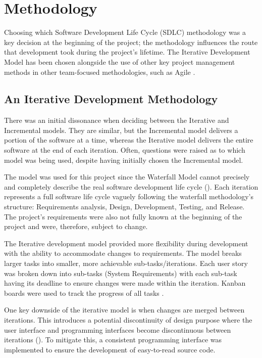 \chapter{Methodology}
\label{chap:methodology}

Choosing which Software Development Life Cycle (SDLC) methodology was a key decision at the beginning of the project; the methodology influences the route that development took during the project's lifetime. The Iterative Development Model has been chosen alongside the use of other key project management methods in other team-focused methodologies, such as Agile .

\section{An Iterative Development Methodology}
\label{methodology:chosen}

There was an initial dissonance when deciding between the Iterative and Incremental models. They are similar, but the Incremental model delivers a portion of the software at a time, whereas the Iterative model delivers the entire software at the end of each iteration. Often, questions were raised as to which model was being used, despite having initially chosen the Incremental model. 

The model was used for this project since the Waterfall Model cannot precisely and completely describe the real software development life cycle (\cite{dapeng_liu_case_2011}). Each iteration represents a full software life cycle vaguely following the waterfall methodology's structure: Requirements analysis, Design, Development, Testing, and Release. The project's requirements were also not fully known at the beginning of the project and were, therefore, subject to change. 

The Iterative development model provided more flexibility during development with the ability to accommodate changes to requirements. The model breaks larger tasks into smaller, more achievable sub-tasks/iterations. Each user story was broken down into sub-tasks (System Requirements)  with each sub-task having its deadline to ensure changes were made within the iteration. Kanban boards were used to track the progress of all tasks .

One key downside of the iterative model is when changes are merged between iterations. This introduces a potential discontinuity of design purpose where the user interface and programming interfaces become discontinuous between iterations (\cite{dapeng_liu_case_2011}). To mitigate this, a consistent programming interface was implemented to ensure the development of easy-to-read source code.

